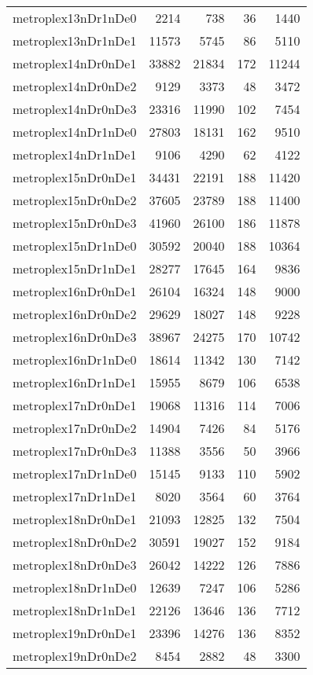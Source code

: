 \begin{longtable}{lrrrr}
metroplex13nDr1nDe0 & 2214 & 738 & 36 & 1440 \\
metroplex13nDr1nDe1 & 11573 & 5745 & 86 & 5110 \\
metroplex14nDr0nDe1 & 33882 & 21834 & 172 & 11244 \\
metroplex14nDr0nDe2 & 9129 & 3373 & 48 & 3472 \\
metroplex14nDr0nDe3 & 23316 & 11990 & 102 & 7454 \\
metroplex14nDr1nDe0 & 27803 & 18131 & 162 & 9510 \\
metroplex14nDr1nDe1 & 9106 & 4290 & 62 & 4122 \\
metroplex15nDr0nDe1 & 34431 & 22191 & 188 & 11420 \\
metroplex15nDr0nDe2 & 37605 & 23789 & 188 & 11400 \\
metroplex15nDr0nDe3 & 41960 & 26100 & 186 & 11878 \\
metroplex15nDr1nDe0 & 30592 & 20040 & 188 & 10364 \\
metroplex15nDr1nDe1 & 28277 & 17645 & 164 & 9836 \\
metroplex16nDr0nDe1 & 26104 & 16324 & 148 & 9000 \\
metroplex16nDr0nDe2 & 29629 & 18027 & 148 & 9228 \\
metroplex16nDr0nDe3 & 38967 & 24275 & 170 & 10742 \\
metroplex16nDr1nDe0 & 18614 & 11342 & 130 & 7142 \\
metroplex16nDr1nDe1 & 15955 & 8679 & 106 & 6538 \\
metroplex17nDr0nDe1 & 19068 & 11316 & 114 & 7006 \\
metroplex17nDr0nDe2 & 14904 & 7426 & 84 & 5176 \\
metroplex17nDr0nDe3 & 11388 & 3556 & 50 & 3966 \\
metroplex17nDr1nDe0 & 15145 & 9133 & 110 & 5902 \\
metroplex17nDr1nDe1 & 8020 & 3564 & 60 & 3764 \\
metroplex18nDr0nDe1 & 21093 & 12825 & 132 & 7504 \\
metroplex18nDr0nDe2 & 30591 & 19027 & 152 & 9184 \\
metroplex18nDr0nDe3 & 26042 & 14222 & 126 & 7886 \\
metroplex18nDr1nDe0 & 12639 & 7247 & 106 & 5286 \\
metroplex18nDr1nDe1 & 22126 & 13646 & 136 & 7712 \\
metroplex19nDr0nDe1 & 23396 & 14276 & 136 & 8352 \\
metroplex19nDr0nDe2 & 8454 & 2882 & 48 & 3300 \\

\end{longtable}
